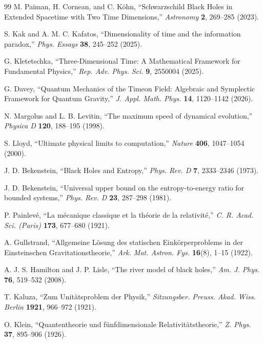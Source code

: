 \documentclass[11pt,a4paper]{article}
\theoremstyle{definition}
\theoremstyle{remark}
\begin{document}
\begin{thebibliography}{99}
 M. Paiman, H. Cornean, and C. K\"ohn, ``Schwarzschild Black Holes in Extended Spacetime with Two Time Dimensions,'' \textit{Astronomy} \textbf{2}, 269--285 (2023).

 S. Kak and A. M. C. Kafatos, ``Dimensionality of time and the information paradox,'' \textit{Phys. Essays} \textbf{38}, 245--252 (2025).

 G. Kletetschka, ``Three-Dimensional Time: A Mathematical Framework for Fundamental Physics,'' \textit{Rep. Adv. Phys. Sci.} \textbf{9}, 2550004 (2025).

 G. Davey, ``Quantum Mechanics of the Timeon Field: Algebraic and Symplectic Framework for Quantum Gravity,'' \textit{J. Appl. Math. Phys.} \textbf{14}, 1120--1142 (2026).

 N. Margolus and L. B. Levitin, ``The maximum speed of dynamical evolution,'' \textit{Physica D} \textbf{120}, 188--195 (1998).

 S. Lloyd, ``Ultimate physical limits to computation,'' \textit{Nature} \textbf{406}, 1047--1054 (2000).

 J. D. Bekenstein, ``Black Holes and Entropy,'' \textit{Phys. Rev. D} \textbf{7}, 2333--2346 (1973).

 J. D. Bekenstein, ``Universal upper bound on the entropy-to-energy ratio for bounded systems,'' \textit{Phys. Rev. D} \textbf{23}, 287--298 (1981).

 P. Painlev\'e, ``La m\'ecanique classique et la th\'eorie de la relativit\'e,'' \textit{C. R. Acad. Sci. (Paris)} \textbf{173}, 677--680 (1921).

 A. Gullstrand, ``Allgemeine L\"osung des statischen Eink\"orperproblems in der Einsteinschen Gravitationstheorie,'' \textit{Ark. Mat. Astron. Fys.} \textbf{16}(8), 1--15 (1922).

 A. J. S. Hamilton and J. P. Lisle, ``The river model of black holes,'' \textit{Am. J. Phys.} \textbf{76}, 519--532 (2008).

 T. Kaluza, ``Zum Unit\"atsproblem der Physik,'' \textit{Sitzungsber. Preuss. Akad. Wiss. Berlin} \textbf{1921}, 966--972 (1921).

 O. Klein, ``Quantentheorie und f\"unfdimensionale Relativit\"atstheorie,'' \textit{Z. Phys.} \textbf{37}, 895--906 (1926).


\end{thebibliography}
\end{document}
